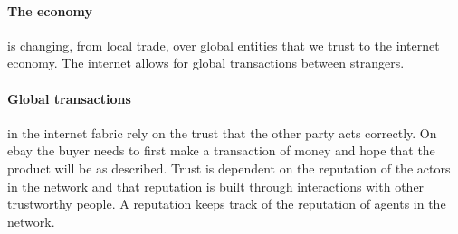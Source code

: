 


\paragraph{The economy} is changing, from local trade, over global entities that
we trust to the internet economy. The internet allows for global transactions between
strangers.


\paragraph{Global transactions} in the internet fabric rely on the trust that 
the other party acts correctly. On ebay the buyer needs to first make a transaction
of money and hope that the product will be as described. 
Trust is dependent on the reputation of the actors in the network
and that reputation is built through interactions with other trustworthy people.
A reputation keeps track of the reputation of agents in the network. 

